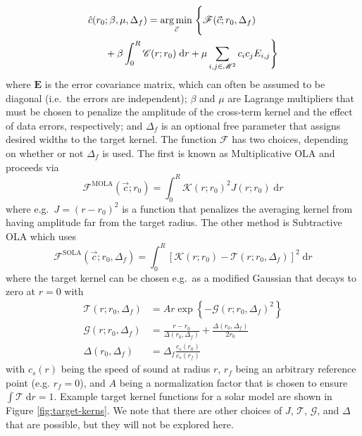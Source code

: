 \documentclass[twocolumn,twocolappendix]{aastex6}
\begin{document}
\begin{align} \label{eq:opt}
        \hat c(r_0&; \beta, \mu, \Delta_f) 
        = 
        \underset{\vec c}{\arg\min} \; \Bigg\{
            \mathscr{F}(\vec c; r_0, \Delta_f) 
\notag\\& + \beta \int_0^R \mathscr{C}(r; r_0) \; \text{d}r 
          + \mu \sum_{i,j \in \mathscr{M}^2} c_i c_j E_{i,j}
         \Bigg\}
\end{align}
where $\mathbf{E}$ is the error covariance matrix, which can often be assumed to be diagonal (i.e.~the errors are independent); $\beta$ and $\mu$ are Lagrange multipliers that must be chosen to penalize the amplitude of the cross-term kernel and the effect of data errors, respectively; and $\Delta_f$ is an optional free parameter that assigns desired widths to the target kernel. The function $\mathscr{F}$ has two choices, depending on whether or not $\Delta_f$ is used. The first is known as Multiplicative OLA \citep{1985SoPh..100...65G,1989ApJ...343..526B} and proceeds via
\begin{equation}
        \mathscr{F}^{\text{MOLA}}(\vec c; r_0)
        = 
        \int_0^R \mathscr{K}(r; r_0)^2 J(r; r_0) \; \text{d}r 
\end{equation}
where e.g.~$J=(r-r_0)^2$ is a function that penalizes the averaging kernel from having amplitude far from the target radius. The other method is Subtractive OLA  \citep{Pijpers1992,Pijpers1994} which uses
\begin{equation}
        \mathscr{F}^{\text{SOLA}}(\vec c; r_0, \Delta_f)
        =  
        \int_0^R \left[ \mathscr{K}(r; r_0) - \mathcal{T}(r; r_0, \Delta_f) \right]^2 \; \text{d}r 
\end{equation}
where the target kernel can be chosen e.g.~as a modified Gaussian that decays to zero at $r=0$ with 
\begin{align}
    \mathcal{T}(r; r_0, \Delta_f) &= A r \exp\left\{-\mathcal{G}(r; r_0, \Delta_f)^2\right\}
\\ \mathcal{G}(r; r_0, \Delta_f) &= \frac{r-r_0}{\Delta(r_0, \Delta_f)} + \frac{\Delta(r_0, \Delta_f)}{2 r_0}
\\ \Delta(r_0, \Delta_f) &= \Delta_f \frac{c_s(r_0)}{c_s(r_f)}
\end{align}
with $c_s(r)$ being the speed of sound at radius $r$, $r_f$ being an arbitrary reference point (e.g. $r_f=0$), and $A$ being a normalization factor that is chosen to ensure $\int \mathcal{T} \; \text{d}r = 1$. Example target kernel functions for a solar model are shown in Figure \ref{fig:target-kerns}. We note that there are other choices of $J$, $\mathcal{T}$, $\mathcal{G}$, and $\Delta$ that are possible, but they will not be explored here. 
\end{document}
